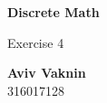 \documentclass[a4paper, 12pt]{article}
\begin{document}
    \begin{center}
        \vspace*{4.4cm}
            
        \Huge
        \textbf{Discrete Math}
            
        \vspace{0.5cm}
        \LARGE
        Exercise 4

        \vfill
            
        \Large
        \textbf{Aviv Vaknin}\\316017128
                    
    \end{center}
\end{document}

